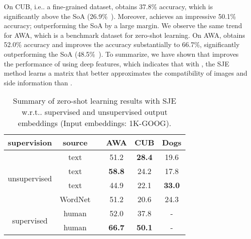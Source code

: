 \documentclass[10pt,twocolumn,letterpaper]{article}
\makeatletter
\newcommand{\cutcaptiondown}{\vspace*{-0.12in}}
\newcommand{\SJE}{SJE\xspace}
\DeclareRobustCommand\onedot{\futurelet\@let@token\@onedot}
\def\@onedot{\ifx\@let@token.\else.\null\fi\xspace}
\def\ie{{i.e}\onedot} \def\Ie{{I.e}\onedot}
\def\wrt{w.r.t\onedot} \def\dof{d.o.f\onedot}
\makeatother
\begin{document}
On CUB, \ie a fine-grained dataset,  obtains 37.8\% accuracy, which is significantly above the SoA (26.9\%~\cite{APHS15}). 
Moreover,  achieves an impressive 50.1\% accuracy; outperforming the SoA by a large margin.
We observe the same trend for AWA, which is a benchmark dataset for zero-shot learning. 
On AWA,  obtains 52.0\% accuracy and  improves the accuracy substantially to 66.7\%, significantly outperforming the SoA (48.5\%~\cite{APHS15}).
To summarize, we have shown that  improves the performance of  using deep features, which indicates that with , the \SJE method learns a matrix  that better approximates the compatibility of images and side information than . 



\begin{table}[t]
 \begin{center}
   \small
  \begin{tabular}{|c|c|c|c|c|c|}
	\hline
	supervision & source &  & \textbf{AWA} & \textbf{CUB} & \textbf{Dogs} \\
	\hline
	
	\multirow{4}{*}{unsupervised} & text &  & 51.2 & \textbf{28.4} & 19.6\\
	 & text &  & \textbf{58.8} & 24.2 & 17.8\\
	 & text &  & 44.9 & 22.1 & \textbf{33.0} \\
	 & WordNet &  & 51.2 & 20.6 & 24.3\\

	\hline
	
	\multirow{2}{*}{supervised} & human &  & 52.0 & 37.8 & -\\
	& human &  & \textbf{66.7} & \textbf{50.1} & -\\
	\hline
  \end{tabular}
 \end{center}
\caption{Summary of zero-shot learning results with \SJE \wrt supervised and unsupervised output embeddings (Input embeddings: 1K-GOOG).}
\cutcaptiondown
\label{tab:summary}
\end{table}
\end{document}
